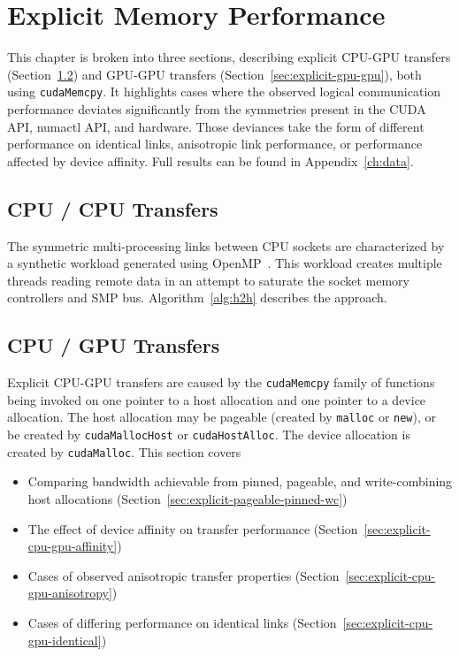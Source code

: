 \chapter{Explicit Memory Performance}
\label{ch:explicit}


This chapter is broken into three sections, describing explicit CPU-GPU transfers (Section~\ref{sec:explicit-cpu-gpu}) and GPU-GPU transfers (Section~\ref{sec:explicit-gpu-gpu}), both using \texttt{cudaMemcpy}.
It highlights cases where the observed logical communication performance deviates significantly from the symmetries present in the CUDA API, numactl API, and hardware.
Those deviances take the form of different performance on identical links, anisotropic link performance, or performance affected by device affinity.
Full results can be found in Appendix~\ref{ch:data}.

\section{CPU / CPU Transfers}
\label{sec:explicit-cpu-cpu}

The symmetric multi-processing links between CPU sockets are characterized by a synthetic workload generated using OpenMP~\cite{openmp2013}.
This workload creates multiple threads reading remote data in an attempt to saturate the socket memory controllers and SMP bus.
Algorithm~\ref{alg:h2h} describes the approach.



\section{CPU / GPU Transfers}
\label{sec:explicit-cpu-gpu}

Explicit CPU-GPU transfers are caused by the \texttt{cudaMemcpy} family of functions being invoked on one pointer to a host allocation and one pointer to a device allocation.
The host allocation may be pageable (created by \texttt{malloc} or \texttt{new}), or be created by \texttt{cudaMallocHost} or \texttt{cudaHostAlloc}.
The device allocation is created by \texttt{cudaMalloc}.
This section covers
\begin{itemize}
\item Comparing bandwidth achievable from pinned, pageable, and write-combining host allocations (Section~\ref{sec:explicit-pageable-pinned-wc})
\item The effect of device affinity on transfer performance (Section~\ref{sec:explicit-cpu-gpu-affinity})
\item Cases of observed anisotropic transfer properties (Section~\ref{sec:explicit-cpu-gpu-anisotropy})
\item Cases of differing performance on identical links (Section~\ref{sec:explicit-cpu-gpu-identical})
\end{itemize}

